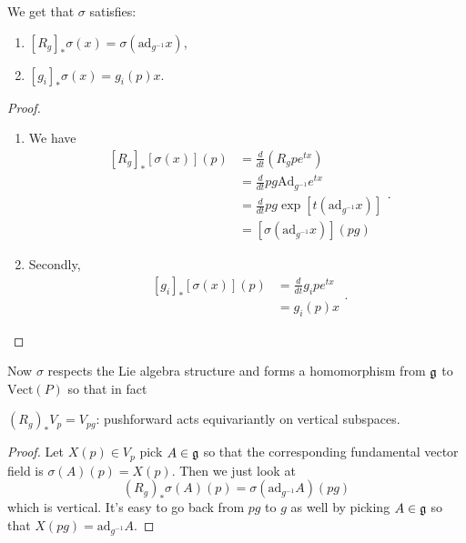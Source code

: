 		\begin{lemma}
			We get that $\sigma$ satisfies:
			\begin{enumerate}
				\item $[R_{g}]_* \sigma(x) = \sigma(\text{ad}_{g^{-1}} x)$,
				\item $[g_i]_* \sigma(x) = g_i(p) x$.
			\end{enumerate}
		\end{lemma}
		\begin{proof}
			\begin{enumerate}
				\item We have
				\begin{equation}
					\begin{aligned}
						\left[ R_{g} \right]_* [\sigma(x)](p)  &= \frac{d}{dt} (R_g p e^{tx}) \\
						& = \frac{d}{dt} p g \text{Ad}_{g^{-1}} e^{tx}\\ 
						& = \frac{d}{dt} p g \exp[ t (\text{ad}_{g^{-1}} x) ]\\
						& = [\sigma(\text{ad}_{g^{-1}} x)] (pg)
					\end{aligned}.
				\end{equation}
				\item Secondly,
				\begin{equation}
					\begin{aligned}
						\left[g_i\right]_* [\sigma(x)](p) &= \frac{d}{dt} g_i p e^{t x}\\
											&= g_i(p) x
					\end{aligned}.
				\end{equation}
			\end{enumerate}
		\end{proof}
	
		Now $\sigma$ respects the Lie algebra structure and forms a homomorphism from $\frak g$ to $\text{Vect}(P)$ so that in fact
		\begin{cor}\label{cor:verticalequiv}
			$(R_g)_* V_p = V_{pg}$: pushforward acts equivariantly on vertical subspaces.
		\end{cor}
		\begin{proof}
			Let $X(p) \in V_p$ pick $A \in \frak g$ so that the corresponding fundamental vector field is $\sigma(A) (p) = X(p)$. Then we just look at
			\begin{equation}
				(R_g)_* \sigma(A) (p) = \sigma(\mathrm{ad}_{g^{-1}} A)(pg)
			\end{equation} 
			which is vertical. It's easy to go back from $pg$ to $g$ as well by picking $A \in \frak g$ so that $X(pg) = \mathrm{ad}_{g^{-1}} A$.
		\end{proof}
	
